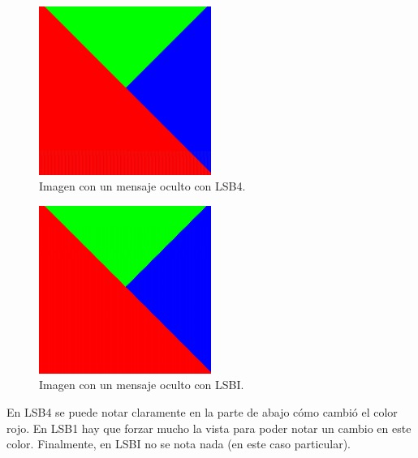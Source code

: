 \documentclass[a4paper,12pt]{article}
\def\FIG#1#2{%
	{\centering#1\par}
	#2}
\begin{document}
\begin{itemize}
\begin{itemize}
			\begin{figure}[h!]%
				\FIG{\includegraphics[width=0.5\textwidth]{tricolor_lsb4.png}}
				{\caption{Imagen con un mensaje oculto con LSB4.}
					\label{fig2}}
			\end{figure}
	
			\begin{figure}[h!]%
				\FIG{\includegraphics[width=0.5\textwidth]{tricolor_lsbi.png}}
				{\caption{Imagen con un mensaje oculto con LSBI.}
					\label{fig3}}
			\end{figure}
					
		
	
		En LSB4 se puede notar claramente en la parte de abajo cómo cambió el color rojo. En LSB1 hay que forzar mucho la vista para poder notar un cambio en este color. Finalmente, en LSBI no se nota nada (en este caso particular).
		

\end{itemize}
\end{itemize}
\end{document}
